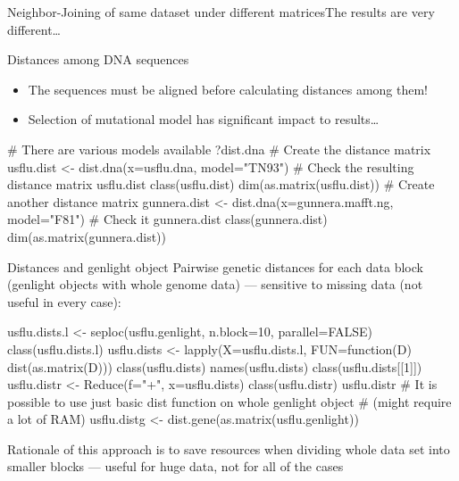 \documentclass[compress, ucs, xelatex, 11pt, xcolor=svgnames, aspectratio=169,
	hyperref={
		bookmarks=true,
		unicode=true,
		colorlinks=true,
		pdftitle={Molecular data in R},
		plainpages=false,
		pdfauthor={Vojtech Zeisek},
		pdfsubject={Course about phylogeny and evolution in R},
		pdfcreator={XeLaTeX},
		pdfkeywords={R, evolution, phylogeny, molecular data},
		linkcolor=Crimson, %
		anchorcolor=Magenta, %
		citecolor=Magenta, %
		filecolor=Magenta, %
		menucolor=Magenta, %
		urlcolor=DodgerBlue, %
		pdftex},
	url={hyphens, lowtilde} %
	]{beamer}
\renewcommand{\texttt}[1]{\colorbox{Beige}{{\ttfamily #1}}}
\begin{document}
\begin{frame}{Neighbor-Joining of same dataset under different matrices}{The results are very different\ldots}
	\begin{center}
		\texttt{[image: distances.png]}
	\end{center}
\end{frame}

\begin{frame}[fragile]{Distances among DNA sequences}
	\begin{itemize}
		\item \alert{The sequences must be aligned before calculating distances among them!}
		\item Selection of mutational model has significant impact to results\ldots
	\end{itemize}
	\vfill
	\begin{spluscode}
    # There are various models available
    ?dist.dna
    # Create the distance matrix
    usflu.dist <- dist.dna(x=usflu.dna, model="TN93")
    # Check the resulting distance matrix
    usflu.dist
    class(usflu.dist)
    dim(as.matrix(usflu.dist))
    # Create another distance matrix
    gunnera.dist <- dist.dna(x=gunnera.mafft.ng, model="F81")
    # Check it
    gunnera.dist
    class(gunnera.dist)
    dim(as.matrix(gunnera.dist))
	\end{spluscode}
\end{frame}

\begin{frame}[fragile]{Distances and genlight object}
	\vfill
	Pairwise genetic distances for each data block (genlight objects with whole genome data) --- sensitive to missing data (not useful in every case):
	\vfill
	\begin{spluscode}
    usflu.dists.l <- seploc(usflu.genlight, n.block=10, parallel=FALSE)
    class(usflu.dists.l)
    usflu.dists <- lapply(X=usflu.dists.l, FUN=function(D) dist(as.matrix(D)))
    class(usflu.dists)
    names(usflu.dists)
    class(usflu.dists[[1]])
    usflu.distr <- Reduce(f="+", x=usflu.dists)
    class(usflu.distr)
    usflu.distr
    # It is possible to use just basic dist function on whole genlight object
    # (might require a lot of RAM)
    usflu.distg <- dist.gene(as.matrix(usflu.genlight))
	\end{spluscode}
	\vfil
	Rationale of this approach is to save resources when dividing whole data set into smaller blocks --- useful for huge data, not for all of the cases
	\vfill
\end{frame}
\end{document}
